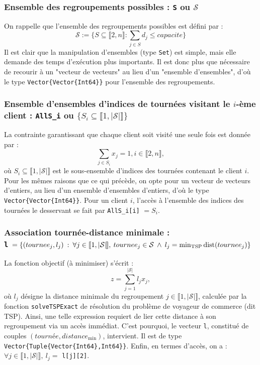 \documentclass[french, 11pt, a4paper]{article} %
\newcommand{\Sc}{\mathcal{S}} %
\newcommand{\smb}{\smallbreak}
\begin{document}
\subsubsection{Ensemble des regroupements possibles : \texttt{S} ou $\Sc$}
On rappelle que l'ensemble des regroupements possibles est défini par :
\[\Sc := \Bigg\{ S \subseteq \llbracket 2,n \rrbracket : \sum_{j \in S} d_j \leq capacite \Bigg\} \]
Il est clair que la manipulation d'ensembles (type \verb+Set+) est simple, mais elle demande des temps d'exécution plus importants.
Il est donc plus que nécessaire de recourir à un "vecteur de vecteurs" au lieu d'un "ensemble d'ensembles", d'où
le type \verb+Vector{Vector{Int64}}+ pour l'ensemble des regroupements.

\subsubsection{Ensemble d'ensembles d'indices de tournées visitant le $i$-ème client : \texttt{AllS\_i} ou $\{S_i \subseteq \llbracket 1, |\Sc| \rrbracket\}$ }
La contrainte garantissant que chaque client soit visité une seule fois est donnée par :
\[ \sum_{j \in S_i} x_j = 1, i \in \llbracket 2,n \rrbracket, \]
où $S_i \subseteq \llbracket 1, |\Sc| \rrbracket$ est le sous-ensemble d'indices des tournées
contenant le client $i$.
Pour les mêmes raisons que ce qui précède, on opte pour un vecteur de vecteurs d'entiers, au lieu d'un ensemble d'ensembles d'entiers,
d'où le type \verb+Vector{Vector{Int64}}+.
\smb Pour un client $i$, l'accès à l'ensemble des indices des tournées le desservant se fait par \texttt{AllS\_i[i]} $=S_i$.

\subsubsection{Association tournée-distance minimale : \\ \texttt{l} 
$= \{(tournee_j,l_j) \: : \: \forall j \in \llbracket 1,|\Sc| \hspace{-0.15cm} \rrbracket,  \:
tournee_j \in \Sc 
\: \land \:
l_j = \min_{\text{\normalfont{TSP}}} \text{\normalfont{dist}}(tournee_j) \}$}

La fonction objectif (à minimiser) s'écrit :
\[ z = \sum_{j=1}^{|\Sc|} l_j x_j,\]
où $l_j$ désigne la distance minimale du regroupement $j \in \llbracket 1,|\Sc| \rrbracket$, calculée par la
fonction \verb+solveTSPExact+ de résolution du problème de voyageur de commerce (dit TSP).
Ainsi, une telle expression requiert de lier cette distance à son regroupement via un accès immédiat.
C'est pourquoi, le vecteur \verb+l+, constitué de couples $(tourn \text{é} e,distance_{\text{min}})$, intervient.
Il est de type \verb+Vector{Tuple{Vector{Int64},Int64}}+.
\smb Enfin, en termes d'accès, on a : $\forall j \in \llbracket 1,|\Sc| \rrbracket, \: l_j = $ \texttt{l[j][2]}.
\end{document}
